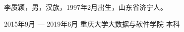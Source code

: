 \documentclass[macfonts,master,oneside]{njuthesis}
\begin{document}
\backmatter
\begin{resume}
\begin{authorinfo}
\noindent 李质颖，男，汉族，1997年2月出生，山东省济宁人。
\end{authorinfo}
\begin{education}
\item[2015年9月 --- 2019年6月] 重庆大学大数据与软件学院 \hfill 本科
\end{education}
\end{resume}


\end{document}
